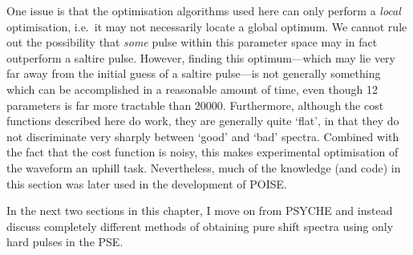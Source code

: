 One issue is that the optimisation algorithms used here can only perform a \textit{local} optimisation, i.e.\ it may not necessarily locate a global optimum.
We cannot rule out the possibility that \textit{some} pulse within this parameter space may in fact outperform a saltire pulse.
However, finding this optimum---which may lie very far away from the initial guess of a saltire pulse---is not generally something which can be accomplished in a reasonable amount of time, even though 12 parameters is far more tractable than 20000.
Furthermore, although the cost functions described here do work, they are generally quite `flat', in that they do not discriminate very sharply between `good' and `bad' spectra.
Combined with the fact that the cost function is noisy, this makes experimental optimisation of the waveform an uphill task.
Nevertheless, much of the knowledge (and code) in this section was later used in the development of POISE.

In the next two sections in this chapter, I move on from PSYCHE and instead discuss completely different methods of obtaining pure shift spectra using only hard pulses in the PSE.
